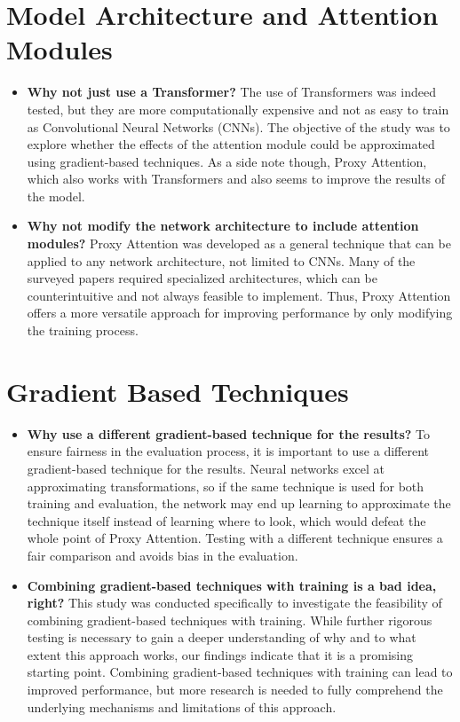 \section{Model Architecture and Attention Modules}
\begin{itemize}
    \item \textbf{Why not just use a Transformer? }The use of Transformers was indeed tested, but they are more computationally expensive and not as easy to train as Convolutional Neural Networks (CNNs). The objective of the study was to explore whether the effects of the attention module could be approximated using gradient-based techniques. As a side note though, Proxy Attention, which also works with Transformers and also seems to improve the results of the model.
    \item \textbf{Why not modify the network architecture to include attention modules? }Proxy Attention was developed as a general technique that can be applied to any network architecture, not limited to CNNs. Many of the surveyed papers required specialized architectures, which can be counterintuitive and not always feasible to implement. Thus, Proxy Attention offers a more versatile approach for improving performance by only modifying the training process.
\end{itemize}

\section{Gradient Based Techniques}
\begin{itemize}
    \item \textbf{Why use a different gradient-based technique for the results?} To ensure fairness in the evaluation process, it is important to use a different gradient-based technique for the results. Neural networks excel at approximating transformations, so if the same technique is used for both training and evaluation, the network may end up learning to approximate the technique itself instead of learning where to look, which would defeat the whole point of Proxy Attention. Testing with a different technique ensures a fair comparison and avoids bias in the evaluation.

    \item \textbf{Combining gradient-based techniques with training is a bad idea, right?} This study was conducted specifically to investigate the feasibility of combining gradient-based techniques with training. While further rigorous testing is necessary to gain a deeper understanding of why and to what extent this approach works, our findings indicate that it is a promising starting point. Combining gradient-based techniques with training can lead to improved performance, but more research is needed to fully comprehend the underlying mechanisms and limitations of this approach.
\end{itemize}

